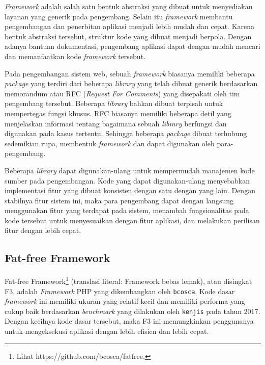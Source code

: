     \textit{Framework} adalah salah satu bentuk abstraksi yang dibuat untuk
    menyediakan layanan yang generik pada pengembang. Selain itu
    \textit{framework} membantu pengembangan dan penerbitan aplikasi menjadi
    lebih mudah dan cepat. Karena bentuk abstraksi tersebut, struktur kode yang
    dibuat menjadi berpola. Dengan adanya bantuan dokumentasi, pengembang
    aplikasi dapat dengan mudah mencari dan memanfaatkan kode \textit{framework}
    tersebut.
    
    Pada pengembangan sistem web, sebuah \textit{framework} biasanya memiliki
    beberapa \textit{package} yang terdiri dari beberapa \textit{library}
    yang telah dibuat generik berdasarkan memorandum atau RFC 
    (\textit{Request For Comments}) yang disepakati oleh tim pengembang
    tersebut\cite{reactjs:rfc}. Beberapa \textit{library} bahkan dibuat terpisah
    untuk mempertegas fungsi khusus. RFC biasanya memiliki beberapa detil yang menjelaskan
    informasi tentang bagaimana sebuah \textit{library} berfungsi dan digunakan
    pada kasus tertentu. Sehingga
    beberapa \textit{package} dibuat terhubung sedemikian rupa, membentuk
    \textit{framework} dan dapat digunakan oleh para-pengembang. 
    
    Beberapa \textit{library} dapat digunakan-ulang untuk mempermudah manajemen 
    kode sumber pada pengembangan.
    Kode yang dapat digunakan-ulang menyebabkan implementasi fitur yang dibuat
    konsisten dengan satu dengan yang lain. Dengan stabilnya fitur sistem ini,
    maka para pengembang dapat dengan langsung menggunakan fitur yang terdapat
    pada sistem, menambah fungsionalitas pada kode tersebut untuk menyesuaikan dengan
    fitur aplikasi, dan melakukan perilisan fitur dengan lebih cepat.

\subsection{Fat-free Framework}
    Fat-free Framework\footnote{Lihat https://github.com/bcosca/fatfree.}
    (translasi literal: Framework bebas lemak), atau disingkat F3, adalah 
    \textit{Framework} PHP yang dikembangkan oleh \texttt{bcosca}. Kode dasar 
    \textit{framework} ini memiliki ukuran yang relatif kecil dan memiliki performa 
    yang cukup baik
    berdasarkan \textit{benchmark} yang dilakukan oleh \texttt{kenjis} pada
    tahun 2017\cite{kenjis:framework-benchmark}. Dengan kecilnya kode dasar
    tersebut, maka F3 ini memungkinkan penggunanya untuk mengeksekusi aplikasi
    dengan lebih efisien dan lebih cepat.
    
